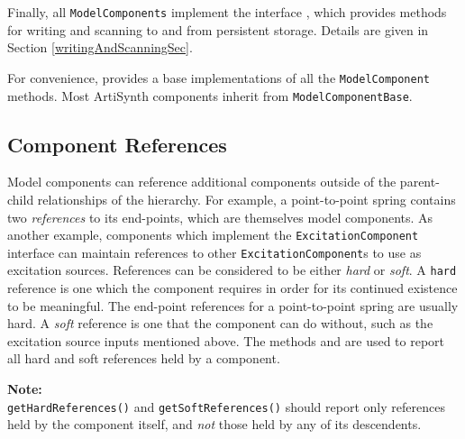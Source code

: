 \documentclass{article}
\begin{document}
Finally, all {\tt ModelComponents} implement the interface
, which provides methods for
writing and scanning to and from persistent storage.  Details are
given in Section \ref{writingAndScanningSec}.

For convenience,  provides a base
implementations of all the {\tt ModelComponent} methods.  Most
ArtiSynth components inherit from {\tt ModelComponentBase}.

\subsection{Component References}
\label{ComponentReferencesSec}

Model components can reference additional components outside of the
parent-child relationships of the hierarchy. For example, a
point-to-point spring contains two {\it references} to its end-points,
which are themselves model components. As another example, components
which implement the {\tt ExcitationComponent} interface can maintain
references to other {\tt ExcitationComponent}s to use as excitation
sources. References can be considered to be either {\it hard} or {\it
soft}. A {\tt hard} reference is one which the component requires in
order for its continued existence to be meaningful. The end-point
references for a point-to-point spring are usually hard. A {\it soft}
reference is one that the component can do without, such as the
excitation source inputs mentioned above. The methods
 and
 are used to report
all hard and soft references held by a component.

\begin{sideblock}
{\bf Note:}\\
{\tt getHardReferences()} and {\tt getSoftReferences()} should report
only references held by the component itself, and {\it not} those held
by any of its descendents.
\end{sideblock}
\end{document}
